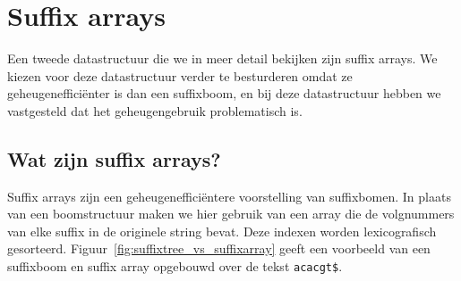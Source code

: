 \chapter{Suffix arrays}\label{ch:suffix-arrays}
Een tweede datastructuur die we in meer detail bekijken zijn suffix arrays.
We kiezen voor deze datastructuur verder te besturderen omdat ze geheugenefficiënter is dan een suffixboom, en bij deze datastructuur hebben we vastgesteld dat het geheugengebruik problematisch is.


\section{Wat zijn suffix arrays?}\label{sec:wat-zijn-suffix-arrays?}
Suffix arrays zijn een geheugenefficiëntere voorstelling van suffixbomen.
In plaats van een boomstructuur maken we hier gebruik van een array die de volgnummers van elke suffix in de originele string bevat.
Deze indexen worden lexicografisch gesorteerd.
Figuur~\ref{fig:suffixtree_vs_suffixarray} geeft een voorbeeld van een suffixboom en suffix array opgebouwd over de tekst \texttt{acacgt\$}.

